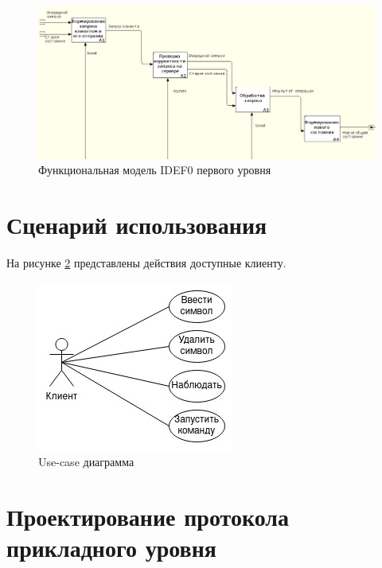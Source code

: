 \begin{center}
	\begin{figure}[H]
		\begin{center}
			\includegraphics[scale=0.35]{img/idef0-a1.png}
		\end{center}
		\caption{\label{fig:idef0-a1} Функциональная модель IDEF0 первого уровня}
	\end{figure}
\end{center}

\section{Сценарий использования}

На рисунке \ref{fig:use-case} представлены действия доступные клиенту.

\begin{center}
	\begin{figure}[H]
		\begin{center}
			\includegraphics[scale=1]{img/usecase.jpg}
		\end{center}
		\caption{\label{fig:use-case} Use-case диаграмма}
	\end{figure}
\end{center}

\section{Проектирование протокола прикладного уровня}


